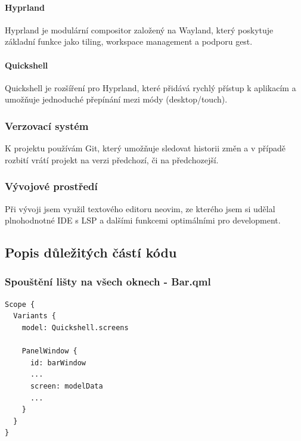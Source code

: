 \documentclass[12pt,a4paper]{article}
\begin{document}
\paragraph{Hyprland}
Hyprland je modulární compositor založený na Wayland, který poskytuje základní funkce jako tiling, workspace management
a podporu gest. \autocite{HyprlandWiki2026}

\paragraph{Quickshell}
Quickshell je rozšíření pro Hyprland, které přidává rychlý přístup k aplikacím a umožňuje jednoduché přepínání mezi
módy (desktop/touch). \autocite{Quickshell}

\subsubsection{Verzovací systém}
K projektu používám Git, který umožňuje sledovat historii změn a v případě rozbití vrátí projekt na verzi předchozí, či na předchozejší.

\subsubsection{Vývojové prostředí}
Při vývoji jsem využil textového editoru neovim, ze kterého jsem si udělal plnohodnotné IDE s LSP a dalšími funkcemi
optimálními pro development. \autocite{Neovim}

\clearpage
\subsection{Popis důležitých částí kódu}
\subsubsection{Spouštění lišty na všech oknech - Bar.qml}
\label{Bar.qml 0}
\begin{lstlisting}
Scope {
  Variants {
    model: Quickshell.screens

    PanelWindow {
      id: barWindow
      ...
      screen: modelData
      ...
    }
  }
}
\end{lstlisting}

\clearpage
\end{document}
